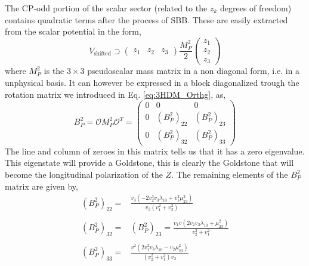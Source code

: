 The CP-odd portion of the scalar sector (related to the $z_k$ degrees of freedom) contains quadratic terms after the process of SBB. 
%
These are easily extracted from the scalar potential in the form, 
%
\begin{equation}
V_{\text{shifted}} \supset \left( \begin{array}{ccc} z_1 & z_2 & z_3 \end{array} \right) \frac{M_P^2}{2} \left( \begin{array}{c} z_1 \\ z_2 \\ z_3 \end{array} \right)  
\end{equation}
%
where $M_P^2$ is the $3\times3$ pseudoscalar mass matrix in a non diagonal form, i.e. in a unphysical basis. 
%
It can however be expressed in a block diagonalized trough the rotation matrix we introduced in Eq. \ref{eq:3HDM_Orthg}, as,
%
\begin{equation}
B^2_P = \mathcal{O} M_P^2 \mathcal{O}^T = \left( \begin{array}{ccc}
0 & 0 & 0 \\ 
0 & \left( B^2_P \right)_{22} &  \left( B^2_P \right)_{23} \\
0 & \left( B^2_P \right)_{32} &  \left( B^2_P \right)_{33}
\end{array} \right) 
\end{equation}
%
The line and column of zeroes in this matrix tells us that it has a zero eigenvalue. This eigenstate will provide a Goldstone, this is clearly the Goldstone that will become the longitudinal polarization of the $Z$. 
%
%
The remaining elements of the $B^2_P$ matrix are given by,
\begin{equation}
\begin{split}
\left( B^2_P \right)_{22} = &  \frac{ 
v_3 \left( -2 v^3_2 v_3 \lambda_10 +  v_1^2 \mu_{23}^2 \right) } 
{v_2 \left( v_1^2 + v_2^2 \right)  }  
\\
\\ 
\left( B^2_P \right)_{32} = & \left( B^2_P \right)_{23} = \frac{v_1 v \left( 2 v_2 v_3 \lambda_{10} + \mu_{23}^2 \right) }{v_2^2 + v_1^2} \\
\\
\left( B^2_P \right)_{33} = & \frac{v^2 \left( 2 v_1^2 v_3 \lambda_{10} - v_2 \mu_{23}^2 \right) }{\left( v_2^2 + v_1^2\right) v_3 }
\end{split} 
\end{equation}
